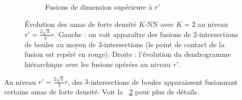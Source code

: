 \begin{figure}[htbp]
\begin{subfigure}[b]{0.53\textwidth}
        \caption{Fusions de dimension supérieure à $r'$}
        \label{fig:fusion_rprime}
    \end{subfigure}
    
    \caption{Évolution des amas de forte densité $K$-NN avec $K=2$ au niveau $r' = \frac{2\sqrt{3}}{3}r$. Gauche : on voit apparaître des fusions de $2$-intersections de boules au moyen de $3$-intersections (le point de contact de la fusion est repéré en rouge). Droite : l'évolution du dendrogramme hiérarchique avec les fusions opérées au niveau $r'$.}
    \label{fig:complexe_rprime_exact}
\end{figure}

Au niveau $r' = \frac{2\sqrt{3}}{3}r$, des $3$-intersections de boules apparaissent fusionnant certains amas de forte densité. Voir la \Fig~\ref{fig:complexe_rprime_exact} pour plus de détails.



